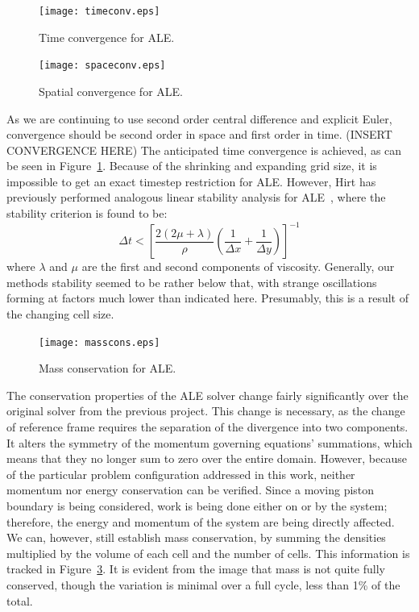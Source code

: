 \documentclass{article}
\begin{document}
\begin{figure}
    \centering
    \texttt{[image: timeconv.eps]}         
    \caption{Time convergence for ALE.}
    \label{fig:timeconv}
  \end{figure}
\begin{figure}
    \centering
    \texttt{[image: spaceconv.eps]}         
    \caption{Spatial convergence for ALE.}
    \label{fig:spaceconv}
  \end{figure}
As we are continuing to use second order central difference and explicit Euler, convergence should be second order in space and first order in time. (INSERT CONVERGENCE HERE)  The anticipated time convergence is achieved, as can be seen in Figure~\ref{fig:timeconv}.
Because of the shrinking and expanding grid size, it is impossible to get an exact timestep restriction for ALE.  However, Hirt has previously performed analogous linear stability analysis for ALE~\cite{hirt74}, where the stability criterion is found to be:
\begin{equation}
  \Delta t < \left[ \frac{2(2\mu + \lambda)}{\rho}\left(\frac{1}{\Delta x} + \frac{1}{\Delta y}\right)\right]^{-1}
\end{equation}
where $\lambda$ and $\mu$ are the first and second components of viscosity.  Generally, our methods stability seemed to be rather below that, with strange oscillations forming at factors much lower than indicated here.  Presumably, this is a result of the changing cell size.  
\begin{figure}
  \centering
  \texttt{[image: masscons.eps]}         
  \caption{Mass conservation for ALE.}
  \label{fig:masscons}
\end{figure}
The conservation properties of the ALE solver change fairly significantly over the original solver from the previous project.  This change is necessary, as the change of reference frame requires the separation of the divergence into two components.  It alters the symmetry of the momentum governing equations' summations, which means that they no longer sum to zero over the entire domain.  However, because of the particular problem configuration addressed in this work, neither momentum nor energy conservation can be verified.  Since a moving piston boundary is being considered, work is being done either on or by the system; therefore, the energy and momentum of the system are being directly affected.  We can, however, still establish mass conservation, by summing the densities multiplied by the volume of each cell and the number of cells.  This information is tracked in Figure~\ref{fig:masscons}.  It is evident from the image that mass is not quite fully conserved, though the variation is minimal over a full cycle, less than 1\% of the total.  
\end{document}
